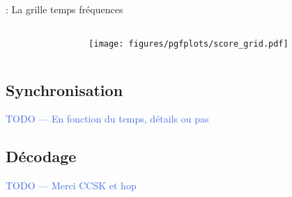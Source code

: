 \documentclass[../main.tex]{subfiles}
\begin{document}
\begin{frame}{\subsecname : {La grille temps fréquences}}
  \begin{columns}
    \begin{column}{.4\linewidth}

    \end{column}
    \begin{column}{.6\linewidth}
      \centering
      \texttt{[image: figures/pgfplots/score\_grid.pdf]}
    \end{column}
  \end{columns}
\end{frame}

\subsection{Synchronisation}

\begin{frame}{\subsecname}
  \begin{center}
    \textcolor{RoyalBlue}{TODO --- En fonction du temps, détails ou pas}
  \end{center}
\end{frame}

\subsection{Décodage}

\begin{frame}{\subsecname}
  \begin{center}
    \textcolor{RoyalBlue}{TODO --- Merci CCSK et hop}
  \end{center}
\end{frame}
\end{document}
